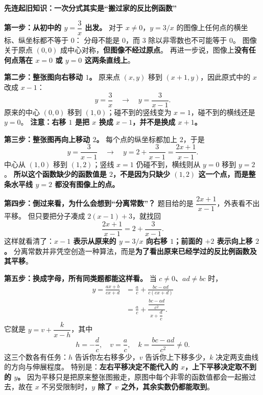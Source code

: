 \clearpage
\begin{explanationbox}

    \textbf{\textcolor{CExplanation}{先连起旧知识：一次分式其实是“搬过家的反比例函数”}}

    \textbf{第一步：从初中的 $y=\dfrac{3}{x}$ 出发。}
    对于 $x\ne0$，$y=3/x$ 的图像上任何点的横坐标、纵坐标都不等于 $0$：
    分母不能是 $0$，而 $3$ 除以非零数也不可能等于 $0$。
    图像关于原点 $(0,0)$ 成中心对称，\textbf{但图像不经过原点}。
    再进一步说，图像上\textbf{没有任何点落在 $x=0$ 或 $y=0$ 这两条直线上}。

    \textbf{第二步：整张图向右移动 $1$。}
    原来点 $(x,y)$ 移到 $(x+1,y)$，因此原式中的 $x$ 改成 $x-1$：
    \[
       y=\frac3x\quad\longrightarrow\quad y=\frac3{x-1}.
    \]
    原来的中心 $(0,0)$ 移到 $(1,0)$；碰不到的竖线变为 $x=1$，碰不到的横线还是 $y=0$。
    \textbf{注意：右移 $1$ 是把 $x$ 换成 $x-1$，并不是换成 $x+1$。}

    \textbf{第三步：整张图再向上移动 $2$。}
    每个点的纵坐标都加上 $2$，于是
    \[
       y=\frac3{x-1}\quad\longrightarrow\quad
       y=2+\frac3{x-1}=\frac{2x+1}{x-1}.
    \]
    中心从 $(1,0)$ 移到 $(1,2)$；竖线 $x=1$ 仍碰不到，横线则从 $y=0$ 移到 $y=2$。
    \textbf{所以这个函数缺少的函数值是 $2$，不是因为只缺少 $(1,2)$ 这一个点，而是整条水平线 $y=2$ 都没有图像上的点。}

    \begin{center}
        
    \end{center}

    \textbf{第四步：倒过来看，为什么会想到“分离常数”？}
    题目给的是 $\dfrac{2x+1}{x-1}$，外表看不出平移。
    但只要把分子凑成 $2(x-1)+3$，就找回
    \[
        \frac{2x+1}{x-1}=2+\frac3{x-1}.
    \]
    这样就看清了：\textbf{$x-1$ 表示从原来的 $y=3/x$ 向右移 $1$；前面的 $+2$ 表示向上移 $2$。}
    分离常数并非凭空创造一种算法，而是\textbf{为了看出原来已经学过的反比例函数及其平移}。

    \textbf{第五步：换成字母，所有同类题都能这样看。}
    当 $c\ne0$、$ad\ne bc$ 时，
    \[
    \begin{aligned}
      y=\frac{ax+b}{cx+d}
        &=\frac ac+\frac{bc-ad}{c(cx+d)}\\
        &=\frac ac+\frac{\dfrac{bc-ad}{c^2}}{x+\dfrac dc}.
    \end{aligned}
    \]
    它就是 $y=v+\dfrac{k}{x-h}$，其中
    \[
        \boxed{h=-\frac dc,\quad v=\frac ac,\quad
               k=\frac{bc-ad}{c^2}\ne0}.
    \]
    这三个数各有任务：$h$ 告诉你左右移多少，$v$ 告诉你上下移多少，$k$ 决定两支曲线的方向与伸展程度。
    特别是：\textbf{左右平移决定不能代入的 $x$，上下平移决定取不到的 $y$。}
    因为平移只是把原来整张图搬走，原图中每个非零的函数值都会一起搬过去，故在 $x$ 不另受限制时，\textbf{$y$ 除了 $v$ 之外，其余实数仍都能取到}。


\end{explanationbox}
